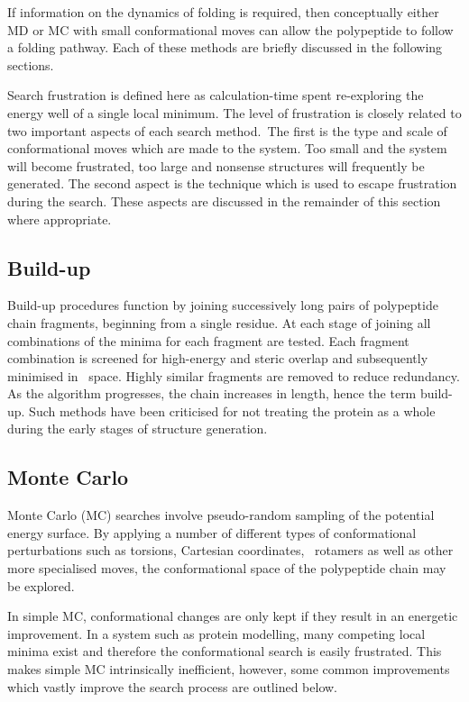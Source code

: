 If information on the dynamics of folding is required, then conceptually either MD or  MC with small conformational moves can allow the polypeptide to follow a folding pathway.
Each of these methods are briefly discussed in the following sections.

Search frustration is defined here as calculation-time spent re-exploring
the energy well of a single local minimum. The level of frustration is closely related to two important aspects of each search method.\ The first is the type and scale of conformational moves which are made to the system. Too small and the system will become frustrated, too large and nonsense structures will frequently be generated. The second aspect is
the technique which is used to escape
frustration during the search.  These aspects are discussed
in the remainder of this section where appropriate.

 

 

\subsection{Build-up}

Build-up procedures   function by joining successively long pairs of 
 polypeptide chain fragments, beginning from a single residue\cite{SIMULATION:BUILDUP}. At each stage of joining all combinations of the minima for each fragment are tested. Each fragment combination is screened for high-energy and steric overlap and subsequently minimised in \phipsi\ space. Highly similar fragments are removed to reduce redundancy. As the algorithm progresses, the chain increases in length, hence the term build-up. Such methods have been criticised
for not treating the protein as a whole during the early stages of structure
generation.

 
\subsection{Monte Carlo}

Monte Carlo (MC) searches involve pseudo-random sampling of the potential
energy surface\cite{SIMULATION:MC}. By applying a number of different types of conformational perturbations such as torsions, Cartesian coordinates, \sidechain\
rotamers as well as other more specialised moves, the conformational space
of the polypeptide chain may be explored. 

In simple MC, conformational changes are only kept if they result in an energetic
improvement.  In a system such
as protein modelling, many competing local minima exist and therefore the
conformational search is easily frustrated. This makes simple MC intrinsically inefficient, however, some common improvements which vastly improve the search process are outlined below.  

